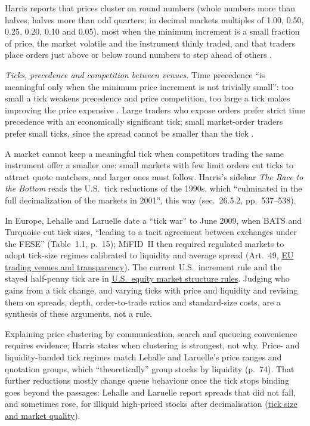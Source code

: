 \begin{qfdefinition}
Harris reports that prices cluster on round numbers (whole numbers more than halves, halves more than odd quarters; in decimal markets multiples of 1.00, 0.50, 0.25, 0.20, 0.10 and 0.05), most when the minimum increment is a small fraction of price, the market volatile and the instrument thinly traded, and that traders place orders just above or below round numbers to step ahead of others \citep[chap.~5, box ``Price Clustering'', p.~91]{alpha-harris}.

\emph{Ticks, precedence and competition between venues}. Time precedence ``is meaningful only when the minimum price increment is not trivially small'': too small a tick weakens precedence and price competition, too large a tick makes improving the price expensive \citep[chap.~6, sec.~6.1.1.2, p.~114]{alpha-harris}. Large traders who expose orders prefer strict time precedence with an economically significant tick; small market-order traders prefer small ticks, since the spread cannot be smaller than the tick \citep[chap.~26, sec.~26.3.1, p.~531]{alpha-harris}.

A market cannot keep a meaningful tick when competitors trading the same instrument offer a smaller one: small markets with few limit orders cut ticks to attract quote matchers, and larger ones must follow. Harris's sidebar \emph{The Race to the Bottom} reads the U.S.\ tick reductions of the 1990s, which ``culminated in the full decimalization of the markets in 2001'', this way (sec.~26.5.2, pp.~537--538).

In Europe, Lehalle and Laruelle date a ``tick war'' to June 2009, when BATS and Turquoise cut tick sizes, ``leading to a tacit agreement between exchanges under the FESE'' (Table~1.1, p.~15); MiFID~II then required regulated markets to adopt tick-size regimes calibrated to liquidity and average spread (Art.~49, \hyperref[rule:eu-trading-venue-transparency]{EU trading venues and transparency}). The current U.S.\ increment rule and the stayed half-penny tick are in \hyperref[rule:us-equity-market-structure]{U.S.\ equity market structure rules}. Judging who gains from a tick change, and varying ticks with price and liquidity and revising them on spreads, depth, order-to-trade ratios and standard-size costs, are a synthesis of these arguments, not a rule.

 Explaining price clustering by communication, search and queueing convenience requires evidence; Harris states when clustering is strongest, not why. Price- and liquidity-banded tick regimes match Lehalle and Laruelle's price ranges and quotation groups, which ``theoretically'' group stocks by liquidity (p.~74). That further reductions mostly change queue behaviour once the tick stops binding goes beyond the passages: Lehalle and Laruelle report spreads that did not fall, and sometimes rose, for illiquid high-priced stocks after decimalisation (\hyperref[ev:tick-size-market-quality]{tick size and market quality}).


\end{qfdefinition}
